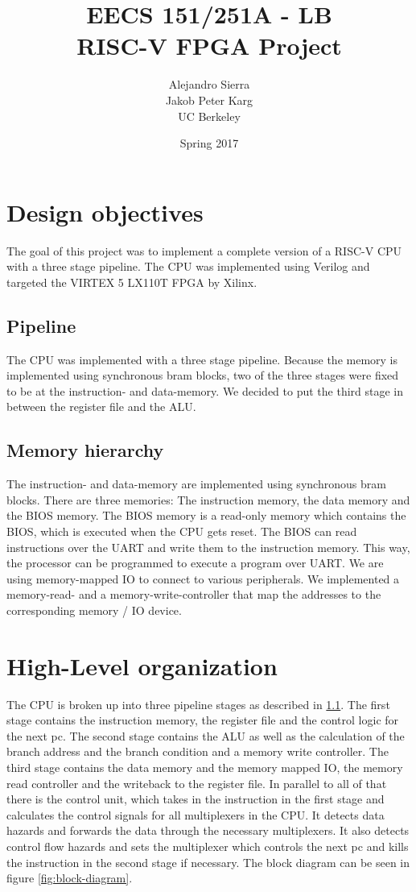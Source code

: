 \documentclass[12pt]{article}
\title{EECS 151/251A - LB\\ RISC-V FPGA Project}
\author{Alejandro Sierra \\ Jakob Peter Karg\\ UC Berkeley}
\date{Spring 2017}
\begin{document}
\maketitle

\section{Design objectives}

The goal of this project was to implement a complete version of a RISC-V CPU with a three stage pipeline. The CPU was implemented using Verilog and targeted the VIRTEX 5 LX110T FPGA by Xilinx.

\subsection{Pipeline}
\label{sub:pipeline-intro}
The CPU was implemented with a three stage pipeline. Because the memory is implemented using synchronous bram blocks, two of the three stages were fixed to be at the instruction- and data-memory. We decided to put the third stage in between the register file and the ALU.

\subsection{Memory hierarchy}

The instruction- and data-memory are implemented using synchronous bram blocks. There are three memories: The instruction memory, the data memory and the BIOS memory. The BIOS memory is a read-only memory which contains the BIOS, which is executed when the CPU gets reset. The BIOS can read instructions over the UART and write them to the instruction memory. This way, the processor can be programmed to execute a program over UART.
We are using memory-mapped IO to connect to various peripherals. We implemented a memory-read- and a memory-write-controller that map the addresses to the corresponding memory / IO device.

\section{High-Level organization}
The CPU is broken up into three pipeline stages as described in \ref{sub:pipeline-intro}. The first stage contains the instruction memory, the register file and the control logic for the next pc. The second stage contains the ALU as well as the calculation of the branch address and the branch condition and a memory write controller. The third stage contains the data memory and the memory mapped IO, the memory read controller and the writeback to the register file. In parallel to all of that there is the control unit, which takes in the instruction in the first stage and calculates the control signals for all multiplexers in the CPU. It detects data hazards and forwards the data through the necessary multiplexers. It also detects control flow hazards and sets the multiplexer which controls the next pc and kills the instruction in the second stage if necessary.
The block diagram can be seen in figure \ref{fig:block-diagram}.
\end{document}
